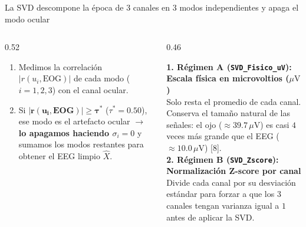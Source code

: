 \documentclass[aspectratio=169,9pt]{beamer}
\begin{document}
\begin{frame}{La SVD descompone la \'epoca de 3 canales en 3 modos independientes y apaga el modo ocular}
\begin{columns}[T,onlytextwidth]
\begin{column}{0.52\textwidth}
      \begin{tcolorbox}[tealcard, title={\scriptsize\bfseries Regla Sencilla de Limpieza (Truncamiento por Correlaci\'on)}, colbacktitle=UDTeal!85!black, coltitle=white]
        \scriptsize
        \begin{enumerate}\scriptsize\setlength{\itemsep}{1pt}
          \item Medimos la correlaci\'on $|r(u_i, \text{EOG})|$ de cada modo ($i=1,2,3$) con el canal ocular.
          \item Si $\mathbf{|r(u_i, \text{EOG})| \ge \tau^*}$ ($\tau^* = 0.50$), ese modo es el artefacto ocular $\to$ \textbf{lo apagamos haciendo $\sigma_i = 0$} y sumamos los modos restantes para obtener el EEG limpio $\widehat{X}$.
        \end{enumerate}
      \end{tcolorbox}
    \end{column}

    \begin{column}{0.46\textwidth}
      \begin{tcolorbox}[basecard, title={\scriptsize\bfseries Dos Formas de Preprocesar Antes de la SVD}, colbacktitle=UDNavy, coltitle=white]
        \scriptsize
        \textbf{1. R\'egimen A (\texttt{SVD\_Fisico\_uV}): Escala f\'isica en microvoltios ($\mu\text{V}$)}\\
        Solo resta el promedio de cada canal. Conserva el tama\~no natural de las se\~nales: el ojo ($\approx 39.7\,\mu\text{V}$) es casi $4$ veces m\'as grande que el EEG ($\approx 10.0\,\mu\text{V}$) [8].\\[0.08cm]
        \textbf{2. R\'egimen B (\texttt{SVD\_Zscore}): Normalizaci\'on Z-score por canal}\\
        Divide cada canal por su desviaci\'on est\'andar para forzar a que los 3 canales tengan varianza igual a $1$ antes de aplicar la SVD.
      \end{tcolorbox}

      \vspace{0.04cm}


\end{column}
\end{columns}
\end{frame}
\end{document}
